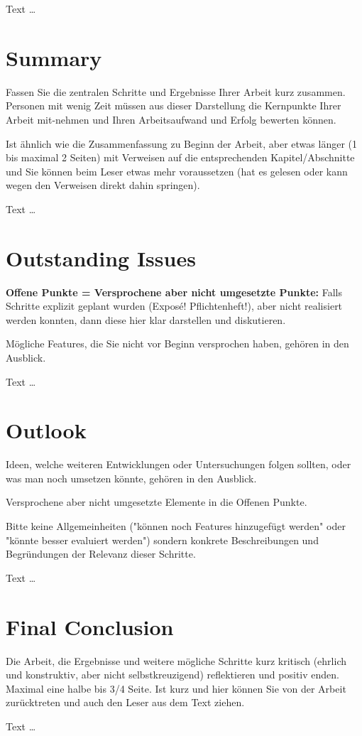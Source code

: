 \documentclass[11pt,a4paper,english]{scrreprt}
\newenvironment{comment}
  {\par\medskip
   \begingroup\color{olive}%
   }
 {\endgroup
  \medskip}
\begin{document}
Text \dots

\section{Summary}
\begin{comment}
Fassen Sie die zentralen Schritte und Ergebnisse Ihrer Arbeit kurz zusammen. Personen mit wenig Zeit müssen aus dieser Darstellung die Kernpunkte Ihrer Arbeit mit-nehmen und Ihren Arbeitsaufwand und Erfolg bewerten können.

Ist ähnlich wie die Zusammenfassung zu Beginn der Arbeit, aber etwas länger (1 bis maximal 2 Seiten) mit Verweisen auf die entsprechenden Kapitel/Abschnitte und Sie können beim Leser etwas mehr voraussetzen (hat es gelesen oder kann wegen den Verweisen direkt dahin springen).
\end{comment}

Text \dots

\section{Outstanding Issues}
\begin{comment}
\textbf{Offene Punkte = Versprochene aber nicht umgesetzte Punkte:} Falls Schritte explizit geplant wurden (Exposé! Pflichtenheft!), aber nicht realisiert werden konnten, dann diese hier klar darstellen und diskutieren.

Mögliche Features, die Sie nicht vor Beginn versprochen haben, gehören in den Ausblick.
\end{comment}

Text \dots

\section{Outlook}
\begin{comment}
Ideen, welche weiteren Entwicklungen oder Untersuchungen folgen sollten, oder was man noch umsetzen könnte, gehören in den Ausblick.

Versprochene aber nicht umgesetzte Elemente in die Offenen Punkte.

Bitte keine Allgemeinheiten ("können noch Features hinzugefügt werden" oder "könnte besser evaluiert werden") sondern konkrete Beschreibungen und Begründungen der Relevanz dieser Schritte.
\end{comment}

Text \dots

\section{Final Conclusion}
\begin{comment}
Die Arbeit, die Ergebnisse und weitere mögliche Schritte kurz kritisch (ehrlich und konstruktiv, aber nicht selbstkreuzigend) reflektieren und positiv enden. Maximal eine halbe bis 3/4 Seite.
Ist kurz und hier können Sie von der Arbeit zurücktreten und auch den Leser aus dem Text ziehen.
\end{comment}

Text \dots

\clearpage

\end{document}
